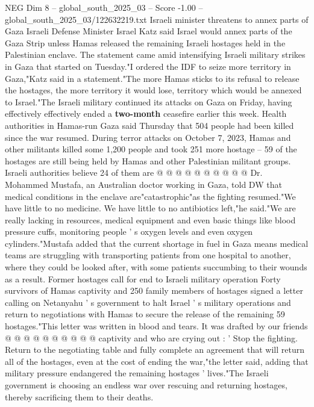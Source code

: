 \begin{textsample}{NEG Dim 8 – global\_south\_2025\_03 – Score -1.00 – global\_south\_2025\_03/122632219.txt}  \label{ex:f8_neg_080}
Israeli minister threatens to annex parts of Gaza Israeli Defense Minister Israel Katz said Israel would annex parts of the Gaza Strip unless Hamas released the remaining Israeli hostages held in the Palestinian enclave.
The statement came amid intensifying Israeli military strikes in Gaza that started on Tuesday."I ordered the IDF to seize more territory in Gaza,"Katz said in a statement."The more Hamas sticks to its refusal to release the hostages, the more territory it would lose, territory which would be annexed to Israel."The Israeli military continued its attacks on Gaza on Friday, having effectively effectively ended a \textbf{two-month} ceasefire earlier this week.
Health authorities in Hamas-run Gaza said Thursday that 504 people had been killed since the war resumed.
During terror attacks on October 7, 2023, Hamas and other militants killed some 1,200 people and took 251 more hostage -- 59 of the hostages are still being held by Hamas and other Palestinian militant groups.
Israeli authorities believe 24 of them are @ @ @ @ @ @ @ @ @ @ Dr.
Mohammed Mustafa, an Australian doctor working in Gaza, told DW that medical conditions in the enclave are"catastrophic"as the fighting resumed."We have little to no medicine.
We have little to no antibiotics left,"he said."We are really lacking in resources, medical equipment and even basic things like blood pressure cuffs, monitoring people ' s oxygen levels and even oxygen cylinders."Mustafa added that the current shortage in fuel in Gaza means medical teams are struggling with transporting patients from one hospital to another, where they could be looked after, with some patients succumbing to their wounds as a result.
Former hostages call for end to Israeli military operation Forty survivors of Hamas captivity and 250 family members of hostages signed a letter calling on Netanyahu ' s government to halt Israel ' s military operations and return to negotiations with Hamas to secure the release of the remaining 59 hostages."This letter was written in blood and tears.
It was drafted by our friends @ @ @ @ @ @ @ @ @ @ captivity and who are crying out : ' Stop the fighting.
Return to the negotiating table and fully complete an agreement that will return all of the hostages, even at the cost of ending the war,"the letter said, adding that military pressure endangered the remaining hostages ' lives."The Israeli government is choosing an endless war over rescuing and returning hostages, thereby sacrificing them to their deaths.

\end{textsample}
